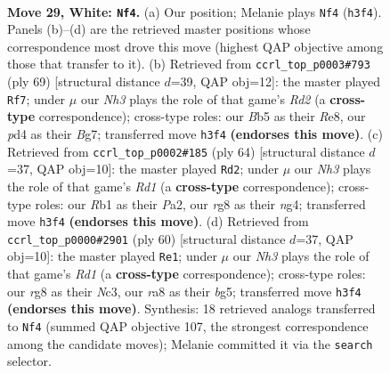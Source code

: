 \documentclass[11pt]{article}
\begin{document}
\clearpage

\begin{figure}[p]\centering
\begin{subfigure}{0.46\textwidth}\centering
\resizebox{\linewidth}{!}{%
\newchessgame
\chessboard[
  setfen={rn4r1/8/7k/1B3p1p/3p4/pP4PN/P4K2/1R6 w - - 0 29},
  showmover=false,
  pgfstyle=straightmove, color=movearrow, markmove={h3-f4}
]}
\caption{}
\end{subfigure}\hfill
\begin{subfigure}{0.46\textwidth}\centering
\resizebox{\linewidth}{!}{%
\newchessgame
\chessboard[
  setfen={4r3/1k1r2bp/1p1p4/p2N4/2P2P2/1P5P/2R3K1/3R4 b - - 0 35},
  showmover=false,
  pgfstyle=straightmove, color=movearrow, markmove={d7-f7}
]}
\caption{}
\end{subfigure}
\\[4pt]
\begin{subfigure}{0.46\textwidth}\centering
\resizebox{\linewidth}{!}{%
\newchessgame
\chessboard[
  setfen={8/2k1rppp/1p6/1B6/5Pn1/6P1/P6P/3R3K w - - 3 33},
  showmover=false,
  pgfstyle=straightmove, color=movearrow, markmove={d1-d2}
]}
\caption{}
\end{subfigure}\hfill
\begin{subfigure}{0.46\textwidth}\centering
\resizebox{\linewidth}{!}{%
\newchessgame
\chessboard[
  setfen={r5k1/6pp/4p3/6b1/p5P1/PnN5/1P3B1P/3R3K w - - 1 31},
  showmover=false,
  pgfstyle=straightmove, color=movearrow, markmove={d1-e1}
]}
\caption{}
\end{subfigure}
\caption{\textbf{Move 29, White: \texttt{Nf4}.} (a) Our position; Melanie plays \texttt{Nf4} (\texttt{h3f4}). Panels (b)--(d) are the retrieved master positions whose correspondence most drove this move (highest QAP objective among those that transfer to it). (b) Retrieved from \texttt{ccrl\_top\_p0003\#793} (ply 69) [structural distance $d$=39, QAP obj=12]: the master played \texttt{Rf7}; under $\mu$ our \emph{Nh3} plays the role of that game's \emph{Rd2} (a \textbf{cross-type} correspondence); cross-type roles: our \emph{B}b5 as their \emph{R}e8, our \emph{p}d4 as their \emph{B}g7; transferred move \texttt{h3f4} \textbf{(endorses this move)}. (c) Retrieved from \texttt{ccrl\_top\_p0002\#185} (ply 64) [structural distance $d$=37, QAP obj=10]: the master played \texttt{Rd2}; under $\mu$ our \emph{Nh3} plays the role of that game's \emph{Rd1} (a \textbf{cross-type} correspondence); cross-type roles: our \emph{R}b1 as their \emph{P}a2, our \emph{r}g8 as their \emph{n}g4; transferred move \texttt{h3f4} \textbf{(endorses this move)}. (d) Retrieved from \texttt{ccrl\_top\_p0000\#2901} (ply 60) [structural distance $d$=37, QAP obj=10]: the master played \texttt{Re1}; under $\mu$ our \emph{Nh3} plays the role of that game's \emph{Rd1} (a \textbf{cross-type} correspondence); cross-type roles: our \emph{r}g8 as their \emph{N}c3, our \emph{r}a8 as their \emph{b}g5; transferred move \texttt{h3f4} \textbf{(endorses this move)}. Synthesis: 18 retrieved analogs transferred to \texttt{Nf4} (summed QAP objective 107, the strongest correspondence among the candidate moves); Melanie committed it via the \texttt{search} selector.}
\label{fig:thought-m56}
\end{figure}
\end{document}
